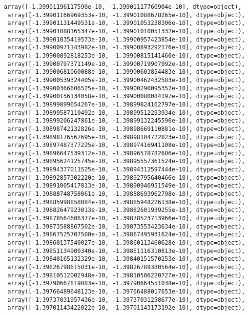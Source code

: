 \documentclass[11pt]{article}
\begin{document}
\begin{tcolorbox}[breakable, size=fbox, boxrule=.5pt, pad at break*=1mm, opacityfill=0]
\begin{Verbatim}[commandchars=\\\{\}]
 array([-1.39901196117590e-10, -1.39901117760904e-10], dtype=object),
 array([-1.39901166969353e-10, -1.39901088678265e-10], dtype=object),
 array([-1.39901131449531e-10, -1.39901053238306e-10], dtype=object),
 array([-1.39901088165347e-10, -1.39901010051332e-10], dtype=object),
 array([-1.39901035419573e-10, -1.39900957423854e-10], dtype=object),
 array([-1.39900971143982e-10, -1.39900893292176e-10], dtype=object),
 array([-1.39900892818253e-10, -1.39900815141460e-10], dtype=object),
 array([-1.39900797371149e-10, -1.39900719907092e-10], dtype=object),
 array([-1.39900681060088e-10, -1.39900603854483e-10], dtype=object),
 array([-1.39900539324405e-10, -1.39900462432583e-10], dtype=object),
 array([-1.39900366606525e-10, -1.39900290095352e-10], dtype=object),
 array([-1.39900156134058e-10, -1.39900080084197e-10], dtype=object),
 array([-1.39899899654267e-10, -1.39899824162797e-10], dtype=object),
 array([-1.39899587110492e-10, -1.39899512293934e-10], dtype=object),
 array([-1.39899206247861e-10, -1.39899132245596e-10], dtype=object),
 array([-1.39898742132826e-10, -1.39898669110881e-10], dtype=object),
 array([-1.39898176567695e-10, -1.39898104722823e-10], dtype=object),
 array([-1.39897487377225e-10, -1.39897416941108e-10], dtype=object),
 array([-1.39896647539312e-10, -1.39896578782606e-10], dtype=object),
 array([-1.39895624125745e-10, -1.39895557361524e-10], dtype=object),
 array([-1.39894377011525e-10, -1.39894312597444e-10], dtype=object),
 array([-1.39892857302220e-10, -1.39892795640466e-10], dtype=object),
 array([-1.39891005417813e-10, -1.39890946951549e-10], dtype=object),
 array([-1.39888748758061e-10, -1.39888693962798e-10], dtype=object),
 array([-1.39885998858084e-10, -1.39885948226138e-10], dtype=object),
 array([-1.39882647923013e-10, -1.39882601939255e-10], dtype=object),
 array([-1.39878564606377e-10, -1.39878523713966e-10], dtype=object),
 array([-1.39873588867502e-10, -1.39873553423634e-10], dtype=object),
 array([-1.39867525707500e-10, -1.39867495931624e-10], dtype=object),
 array([-1.39860137540027e-10, -1.39860113460628e-10], dtype=object),
 array([-1.39851134900340e-10, -1.39851116310813e-10], dtype=object),
 array([-1.39840165132329e-10, -1.39840151570253e-10], dtype=object),
 array([-1.39826798615831e-10, -1.39826789380564e-10], dtype=object),
 array([-1.39810512002948e-10, -1.39810506220727e-10], dtype=object),
 array([-1.39790667819083e-10, -1.39790664551038e-10], dtype=object),
 array([-1.39766489648123e-10, -1.39766488017653e-10], dtype=object),
 array([-1.39737031957436e-10, -1.39737031258677e-10], dtype=object),
 array([-1.39701143422022e-10, -1.39701143173192e-10], dtype=object),

\end{Verbatim}
\end{tcolorbox}
\end{document}
